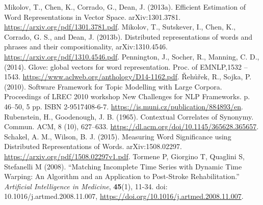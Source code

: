 \documentclass[11pt,french,french]{article}
\begin{document}
\begin{thebibliography}{999}
 Mikolov, T.,  Chen, K., Corrado, G., Dean, J. (2013a). Efficient Estimation of Word Representations in Vector Space. arXiv:1301.3781. \url{https://arxiv.org/pdf/1301.3781.pdf}.
 Mikolov, T., Sutskever, I., Chen, K., Corrado, G. S., and Dean, J. (2013b). Distributed representations of words and phrases and their compositionality, arXiv:1310.4546. \url{https://arxiv.org/pdf/1310.4546.pdf}.
 Pennington, J., Socher, R., Manning, C. D., (2014).  Glove: global vectors for word representation. Proc. of EMNLP,1532 – 1543. \url{https://www.aclweb.org/anthology/D14-1162.pdf}.
 {\v R}eh{\r u}{\v r}ek, R.,  Sojka, P. (2010). Software Framework for Topic Modelling with Large Corpora. Proceedings of LREC 2010 workshop New Challenges for NLP Frameworks. p. 46--50, 5 pp. ISBN 2-9517408-6-7. \url{https://is.muni.cz/publication/884893/en}.
 Rubenstein, H.,  Goodenough, J. B. (1965). Contextual Correlates of Synonymy. Commun. ACM, 8 (10), 627–633. \url{https://dl.acm.org/doi/10.1145/365628.365657}.
 Schakel, A. M., Wilson, B. J. (2015). Measuring Word Significance using Distributed Representations of Words. arXiv:1508.02297. \url{https://arxiv.org/pdf/1508.02297v1.pdf}.
 Tormene P, Giorgino T, Quaglini S, Stefanelli M (2008). “Matching
Incomplete Time Series with Dynamic Time Warping: An Algorithm and an Application to Post-Stroke Rehabilitation.” \emph{Artificial Intelligence
in Medicine}, \textbf{45}(1), 11-34. doi: 10.1016/j.artmed.2008.11.007, \url{https://doi.org/10.1016/j.artmed.2008.11.007}.
\end{thebibliography}
\end{document}
